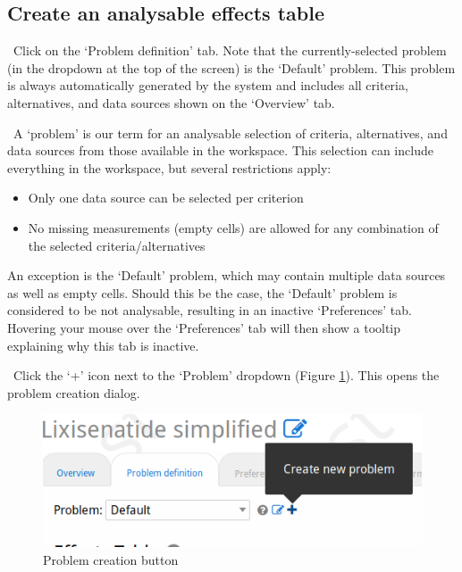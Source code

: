 \documentclass[00_mcda_tutorial.tex]{subfiles}
\begin{document}
\subsection*{Create an analysable effects table}
\leftpointright \, Click on the ‘Problem definition’ tab. Note that the currently-selected problem (in the dropdown at the top of the screen) is the ‘Default’ problem. This problem is always automatically generated by the system and includes all criteria, alternatives, and data sources shown on the ‘Overview’ tab.
\newline

\noindent \faGraduationCap \, A ‘problem’ is our term for an analysable selection of criteria, alternatives, and data sources from those available in the workspace. This selection can include everything in the workspace, but several restrictions apply:

\begin{itemize}
\item Only one data source can be selected per criterion
\item No missing measurements (empty cells) are allowed for any combination of the selected criteria/alternatives
\end{itemize}
	
\noindent An exception is the ‘Default’ problem, which may contain multiple data sources as well as empty cells. Should this be the case, the ‘Default’ problem is considered to be not analysable, resulting in an inactive ‘Preferences’ tab. Hovering your mouse over the ‘Preferences’ tab will then show a tooltip explaining why this tab is inactive.

\noindent \leftpointright \, Click the ‘+’ icon  next to the ‘Problem’ dropdown (Figure \ref{fig:create_problem}). This opens the problem creation dialog.

\begin{figure}[!h]
    \centering
	\includegraphics[width=.8\textwidth]{fig/createProblem.png}
    \caption{Problem creation button}
	\label{fig:create_problem}
\end{figure}
\end{document}

